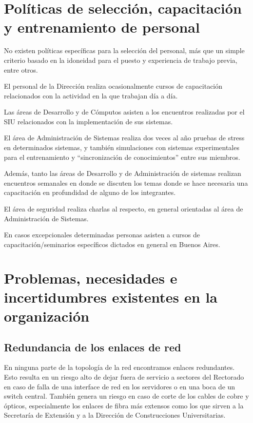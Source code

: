 \documentclass[a4paper,11pt,oneside]{article}
\begin{document}
\section{Políticas de selección, capacitación y entrenamiento de personal}
%
No existen políticas específicas para la selección del personal, más
que un simple criterio basado en la idoneidad para el puesto y
experiencia de trabajo previa, entre otros.

El personal de la Dirección realiza ocasionalmente cursos de
capacitación relacionados con la actividad en la que trabajan día a
día.

Las áreas de Desarrollo y de Cómputos asisten a los encuentros
realizadas por el SIU relacionados con la implementación de sus
sistemas.

El área de Administración de Sistemas realiza dos veces al año pruebas
de stress en determinados sistemas, y también simulaciones con
sistemas experimentales para el entrenamiento y ``sincronización de
conocimientos'' entre sus miembros.

Además, tanto las áreas de Desarrollo y de Administración de sistemas
realizan encuentros semanales en donde se discuten los temas donde se
hace necesaria una capacitación en profundidad de alguno de los
integrantes.

El área de seguridad realiza charlas al respecto, en general
orientadas al área de Administración de Sistemas.

En casos excepcionales determinadas personas asisten a cursos de
capacitación/seminarios específicos dictados en general en Buenos
Aires.
%
\newpage
\section{Problemas, necesidades e incertidumbres existentes en la organización}
%
\subsection{Redundancia de los enlaces de red}
En ninguna parte de la topología de la red encontramos enlaces
redundantes. Esto resulta en un riesgo alto de dejar fuera de servicio
a sectores del Rectorado en caso de falla de una interface de red en
los servidores o en una boca de un switch central. También genera un
riesgo en caso de corte de los cables de cobre y ópticos,
especialmente los enlaces de fibra más extensos como los que sirven a
la Secretaría de Extensión y a la Dirección de Construcciones
Universitarias.
\end{document}

